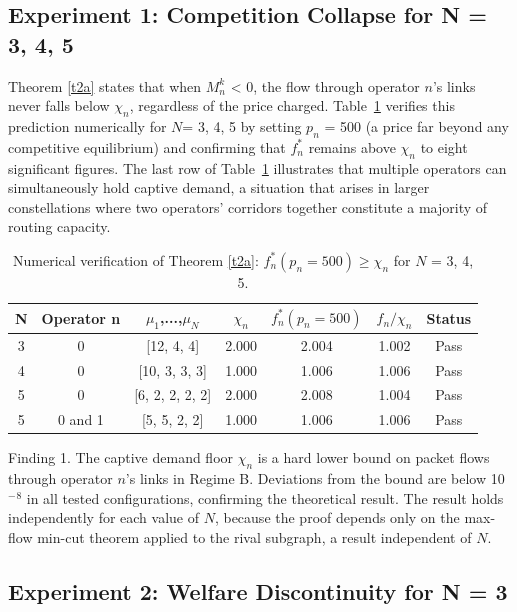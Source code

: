 \documentclass[review,3p,authoryear]{elsarticle}
\begin{document}
\subsection{Experiment 1: Competition Collapse for N = 3, 4, 5}
\label{sec6.1}

Theorem \ref{t2a} states that when $M_{n}^{k}$ < 0, the flow through operator $n$'s links never falls below ${\chi}_{n}$, regardless of the price charged. Table~\ref{tab1} verifies this prediction numerically for $N$= 3, 4, 5 by setting $p_{n}$ = 500 (a price far beyond any competitive equilibrium) and confirming that $f_{n}^{*}$ remains above ${\chi}_{n}$ to eight significant figures. The last row of Table~\ref{tab1} illustrates that multiple operators can simultaneously hold captive demand, a situation that arises in larger constellations where two operators' corridors together constitute a majority of routing capacity.


\begin{table}[!ht]
\centering
\caption{Numerical verification of Theorem \ref{t2a}: $f_{n}^{*}(p_{n} = 500) \ge {\chi}_{n}$ for $N$ = 3, 4, 5.}
\label{tab1}
\begin{tabular}{@{}ccccccc@{}}
\toprule
N & Operator n & $\mu_1$,...,$\mu_N$ & $\chi_n$ & $f_n^*(p_n=500)$ & $f_n/\chi_n$ & Status \\
\midrule
3 & 0 & [12, 4, 4] & 2.000 & 2.004 & 1.002 & Pass \\
4 & 0 & [10, 3, 3, 3] & 1.000 & 1.006 & 1.006 & Pass \\
5 & 0 & [6, 2, 2, 2, 2] & 2.000 & 2.008 & 1.004 & Pass \\
5 & 0 and 1 & [5, 5, 2, 2] & 1.000 & 1.006 & 1.006 & Pass \\
\bottomrule
\end{tabular}
\end{table}

Finding 1. The captive demand floor ${\chi}_{n}$ is a hard lower bound on packet flows through operator $n$'s links in Regime B. Deviations from the bound are below 10\ensuremath{^{-}}\ensuremath{^{8}} in all tested configurations, confirming the theoretical result. The result holds independently for each value of $N$, because the proof depends only on the max-flow min-cut theorem applied to the rival subgraph, a result independent of $N$.

\subsection{Experiment 2: Welfare Discontinuity for N = 3}
\label{sec6.2}
\end{document}
